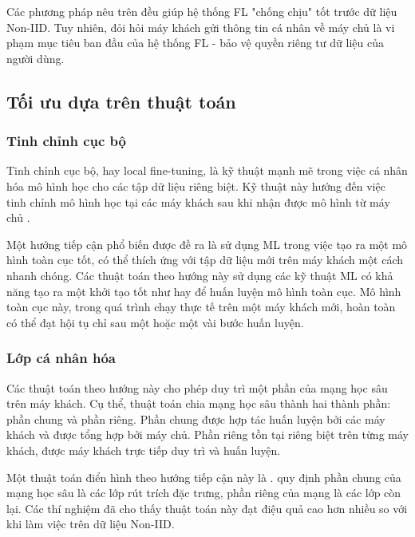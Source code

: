 Các phương pháp nêu trên đều giúp hệ thống FL "chống chịu" tốt trước dữ liệu Non-IID. Tuy nhiên, đỏi hỏi máy khách gửi thông tin cá nhân về máy chủ là vi phạm mục tiêu ban đầu của hệ thống FL - bảo vệ quyền riêng tư dữ liệu của người dùng.

\subsection{Tối ưu dựa trên thuật toán}

\subsubsection{Tinh chỉnh cục bộ}

Tinh chỉnh cục bộ, hay local fine-tuning, là kỹ thuật mạnh mẽ trong việc cá nhân hóa mô hình học cho các tập dữ liệu riêng biệt. Kỹ thuật này hướng đến việc tinh chỉnh mô hình học tại các máy khách sau khi nhận được mô hình từ máy chủ \cite{wang2019federated}.

Một hướng tiếp cận phổ biến được đề ra là sử dụng ML trong việc tạo ra một mô hình toàn cục tốt, có thể thích ứng với tập dữ liệu mới trên máy khách một cách nhanh chóng. Các thuật toán theo hướng này \parencite{chen2018federated, fallah2020personalized} sử dụng các kỹ thuật ML có khả năng tạo ra một khởi tạo tốt như  \cite{finn2017model} hay  \cite{li2017meta} để huấn luyện mô hình toàn cục. Mô hình toàn cục này, trong quá trình chạy thực tế trên một máy khách mới, hoàn toàn có thể đạt hội tụ chỉ sau một hoặc một vài bước huấn luyện.

\subsubsection{Lớp cá nhân hóa}

Các thuật toán theo hướng này cho phép duy trì một phần của mạng học sâu trên máy khách. Cụ thể, thuật toán chia mạng học sâu thành hai thành phần: phần chung và phần riêng. Phần chung được hợp tác huấn luyện bởi các máy khách và được tổng hợp bởi máy chủ. Phần riêng tồn tại riêng biệt trên từng máy khách, được máy khách trực tiếp duy trì và huấn luyện.

Một thuật toán điển hình theo hướng tiếp cận này là  \cite{arivazhagan2019federated}.  quy định phần chung của mạng học sâu là các lớp rút trích đặc trưng, phần riêng của mạng là các lớp còn lại. Các thí nghiệm đã cho thấy thuật toán này đạt điệu quả cao hơn nhiều so với  khi làm việc trên dữ liệu Non-IID.

